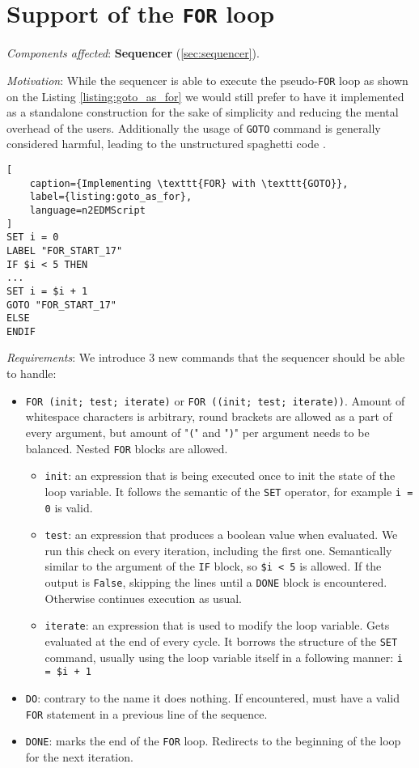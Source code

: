 \section{Support of the \texttt{FOR} loop}
\label{sec:for_loop}

\textit{Components affected}: \textbf{Sequencer} (\ref{sec:sequencer}).

\textit{Motivation}: While the sequencer is able to execute the pseudo-\texttt{FOR} loop as shown on the Listing \ref{listing:goto_as_for} we would still prefer to have it implemented as a standalone construction for the sake of simplicity and reducing the mental overhead of the users. Additionally the usage of \texttt{GOTO} command is generally considered \cite{Dijkstra1968} harmful, leading to the unstructured spaghetti code \cite{Cram2005}.

\begin{lstlisting}[
	caption={Implementing \texttt{FOR} with \texttt{GOTO}}, 
	label={listing:goto_as_for}, 
	language=n2EDMScript
]
SET i = 0
LABEL "FOR_START_17"
IF $i < 5 THEN
...
SET i = $i + 1
GOTO "FOR_START_17"
ELSE
ENDIF
\end{lstlisting}

\textit{Requirements}: We introduce 3 new commands that the sequencer should be able to handle:

\begin{itemize}
	\item \texttt{FOR (init; test; iterate)} or \texttt{FOR ((init; test; iterate))}. Amount of whitespace characters is arbitrary, round brackets are allowed as a part of every argument, but amount of "\texttt{(}" and "\texttt{)}" per argument needs to be balanced. Nested \texttt{FOR} blocks are allowed.
	\begin{itemize}
		\item \texttt{init}: an expression that is being executed once to init the state of the loop variable. It follows the semantic of the \texttt{SET} operator, for example \texttt{i = 0} is valid.
		\item \texttt{test}: an expression that produces a boolean value when evaluated. We run this check on every iteration, including the first one. Semantically similar to the argument of the \texttt{IF} block, so \texttt{\$i < 5} is allowed. If the output is \texttt{False}, skipping the lines until a \texttt{DONE} block is encountered. Otherwise continues execution as usual.
		\item \texttt{iterate}: an expression that is used to modify the loop variable. Gets evaluated at the end of every cycle. It borrows the structure of the \texttt{SET} command, usually using the loop variable itself in a following manner: \texttt{i = \$i + 1}
	\end{itemize}
	\item \texttt{DO}: contrary to the name it does nothing. If encountered, must have a valid \texttt{FOR} statement in a previous line of the sequence.
	\item \texttt{DONE}: marks the end of the \texttt{FOR} loop. Redirects to the beginning of the loop for the next iteration.
\end{itemize}

